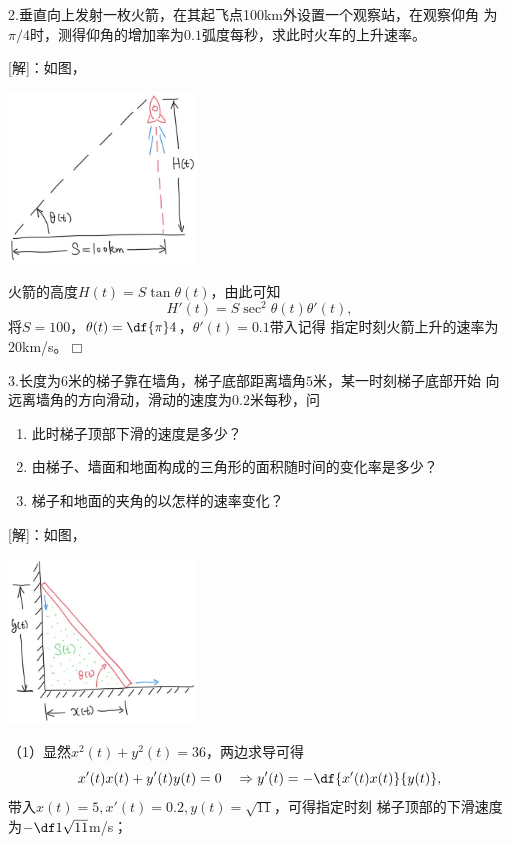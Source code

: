 \bigskip

2.垂直向上发射一枚火箭，在其起飞点100km外设置一个观察站，在观察仰角
为$\pi/4$时，测得仰角的增加率为$0.1$弧度每秒，求此时火车的上升速率。

[解]：如图，
\begin{center}
	\includegraphics[width=5cm]{./images/ch2/Rocket.jpg}
\end{center}
火箭的高度$H(t)=S\tan\theta(t)$，由此可知
$$H'(t)=S\sec^2\theta(t)\theta'(t),$$
将$S=100$，$\theta(t)=\df{\pi}4$，$\theta'(t)=0.1$带入记得
指定时刻火箭上升的速率为$20$km/s。\hfill$\Box$

\bigskip

3.长度为$6$米的梯子靠在墙角，梯子底部距离墙角$5$米，某一时刻梯子底部开始
向远离墙角的方向滑动，滑动的速度为$0.2$米每秒，问
\begin{enumerate}[(1)]
  \setlength{\itemindent}{1cm}
  \item 此时梯子顶部下滑的速度是多少？
  \item 由梯子、墙面和地面构成的三角形的面积随时间的变化率是多少？
  \item 梯子和地面的夹角的以怎样的速率变化？
\end{enumerate}

[解]：如图，
\begin{center}
	\includegraphics[width=5cm]{./images/ch2/ladder.jpg}
\end{center}
（1）显然$x^2(t)+y^2(t)=36$，两边求导可得
$$x'(t)x(t)+y'(t)y(t)=0\quad
\Rightarrow y'(t)=-\df{x'(t)x(t)}{y(t)},$$
带入$x(t)=5,x'(t)=0.2,y(t)=\sqrt{11}$，可得指定时刻
梯子顶部的下滑速度为$-\df1{\sqrt{11}}$m/s；

